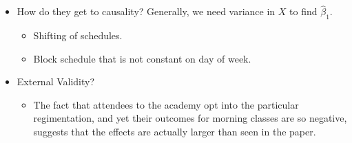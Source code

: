 \documentclass[10pt]{extarticle}
\begin{document}
\begin{itemize}
    \item How do they get to causality? Generally, we need variance in $X$ to find $\hat{\beta}_{1}$.
      \begin{itemize}
        \item Shifting of schedules.
        \item Block schedule that is not constant on day of week.
      \end{itemize}
    \item External Validity?
      \begin{itemize}
        \item The fact that attendees to the academy opt into the particular regimentation, and yet their outcomes for morning classes are so negative, suggests that the effects are actually larger than seen in the paper.
      \end{itemize}
  \end{itemize}
\end{document}
